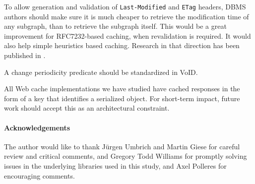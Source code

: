 \documentclass{llncs}
\newcommand{\httph}[1]{\texttt{#1}}
\begin{document}
To allow generation and validation of \httph{Last-Modified} and
\httph{ETag} headers, DBMS authors should make sure it is much cheaper
to retrieve the modification time of any subgraph, than to retrieve
the subgraph itself. This would be a great improvement for
RFC7232-based caching, when revalidation is required. It would also
help simple heuristics based caching. Research in that direction has
been published in \cite{kaseicache}.

A change periodicity predicate should be standardized in VoID.

All Web cache implementations we have studied have cached responses in
the form of a key that identifies a serialized object. For short-term
impact, future work should accept this as an architectural constraint.

\paragraph*{Acknowledgements} The author would like to thank Jürgen
Umbrich and Martin Giese for careful review and critical comments, and
Gregory Todd Williams for promptly solving issues in the underlying
libraries used in this study, and Axel Polleres for encouraging comments.


%
%
%

\end{document}
